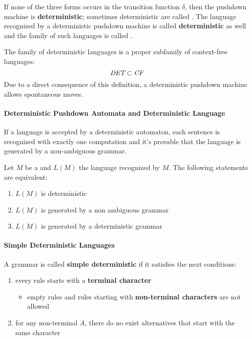 \documentclass[english]{article}
\begin{document}
If none of the three forms occurs in the transition function \(\delta\), then the pushdown machine is \textbf{deterministic};
sometimes deterministic \PDA are called \DPDA.
The language recognized by a deterministic pushdown machine is called \textbf{deterministic} as well and the family of such languages is called \DET.

The family of deterministic languages is a proper subfamily of context-free languages:
\[ \textit{DET} \subset \textit{CF} \]
Due to a direct consequence of this definition, a deterministic pushdown machine allows spontaneous moves.

\paragraph{Deterministic Pushdown Automata and Deterministic Language}

If a language is accepted by a deterministic automaton, each sentence is recognized with exactly one computation and it's provable that the language is generated by a non-ambiguous grammar.

\begin{property}
  Let \(M\) be a \DPDA and \(L(M)\) the language recognized by \(M\).
  The following statements are equivalent:

  \begin{enumerate}
    \item \(L(M)\) is deterministic
    \item \(L(M)\) is generated by a non ambiguous grammar
    \item \(L(M)\) is generated by a deterministic grammar
  \end{enumerate}
\end{property}

\paragraph{Simple Deterministic Languages}

A grammar is called \textbf{simple deterministic} if it satisfies the next conditions:

\begin{enumerate}
  \item every rule \RP starts with a \textbf{terminal character}
        \begin{itemize}
          \item empty rules and rules starting with \textbf{non-terminal characters} are not allowed
        \end{itemize}
  \item for any non-terminal \(A\), there do no exist alternatives that start with the same character
\end{enumerate}
\end{document}
